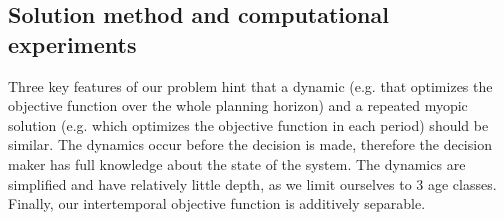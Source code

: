 

\subsection{Solution method and computational experiments}

Three key features of our problem hint that a dynamic (e.g. that optimizes the objective function over the whole planning horizon) and a repeated myopic solution (e.g. which optimizes the objective function in each period)  should be similar. The dynamics occur before the decision is made, therefore the decision maker has full knowledge about the state of the system. The dynamics are simplified and have relatively little depth, as we limit ourselves to 3 age classes. Finally, our intertemporal objective function is additively separable.

